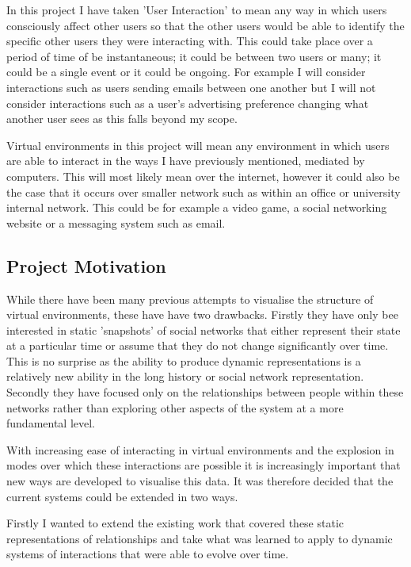 \documentclass[12pt,a4paper]{article}
\begin{document}
In this project I have taken 'User Interaction' to mean any way in which users consciously affect other users so that the other users would be able to identify the specific other users they were interacting with. This could take place over a period of time of be instantaneous; it could be between two users or many; it could be a single event or it could be ongoing. For example I will consider interactions such as users sending emails between one another but I will not consider interactions such as a user's advertising preference changing what another user sees as this falls beyond my scope.

Virtual environments in this project will mean any environment in which users are able to interact in the ways I have previously mentioned, mediated by computers. This will most likely mean over the internet, however it could also be the case that it occurs over smaller network such as within an office or university internal network. This could be for example a video game, a social networking website or a messaging system such as email.

\subsection{Project Motivation}

While there have been many previous attempts to visualise the structure of virtual environments, these have have two drawbacks. Firstly they have only bee interested in static 'snapshots' of social networks that either represent their state at a particular time or assume that they do not change significantly over time. This is no surprise as the ability to produce dynamic representations is a relatively new ability in the long history or social network representation. Secondly they have focused only on the relationships between people within these networks rather than exploring other aspects of the system at a more fundamental level.

With increasing ease of interacting in virtual environments and the explosion in modes over which these interactions are possible it is increasingly important that new ways are developed to visualise this data. It was therefore decided that the current systems could be extended in two ways.

Firstly I wanted to extend the existing work that covered these static representations of relationships and take what was learned to apply to dynamic systems of interactions that were able to evolve over time.
\end{document}
